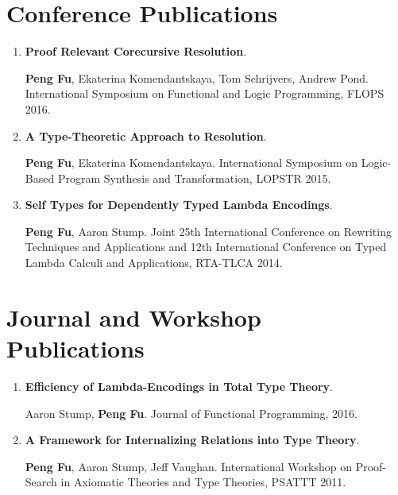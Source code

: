 \documentclass{article}
\begin{document}
\section*{Conference Publications}

\begin{enumerate}

\item \textbf{Proof Relevant Corecursive Resolution}. 

  \textbf{Peng Fu}, Ekaterina Komendantskaya, Tom Schrijvers, Andrew Pond. International Symposium on Functional and Logic Programming, FLOPS 2016.
\item \textbf{A Type-Theoretic Approach to Resolution}. 
  
  \textbf{Peng Fu}, Ekaterina Komendantskaya. International Symposium on Logic-Based Program Synthesis and Transformation, LOPSTR 2015.
  \item \textbf{Self Types for Dependently Typed Lambda Encodings}. 
    
    \textbf{Peng Fu}, Aaron Stump. Joint 25th International Conference on Rewriting Techniques and Applications and 12th International Conference on Typed Lambda Calculi and Applications, RTA-TLCA 2014. 
\end{enumerate}

\section*{Journal and Workshop Publications}

\begin{enumerate}
  
  
\item \textbf{Efficiency of Lambda-Encodings in Total Type Theory}. 
  
  Aaron Stump, \textbf{Peng Fu}.  Journal of Functional Programming, 2016.

  \item \textbf{A Framework for Internalizing Relations into Type Theory}. 

    \textbf{Peng Fu}, Aaron Stump, Jeff Vaughan. International Workshop on Proof-Search in Axiomatic Theories and Type Theories, PSATTT 2011.

\end{enumerate}  
\end{document}
